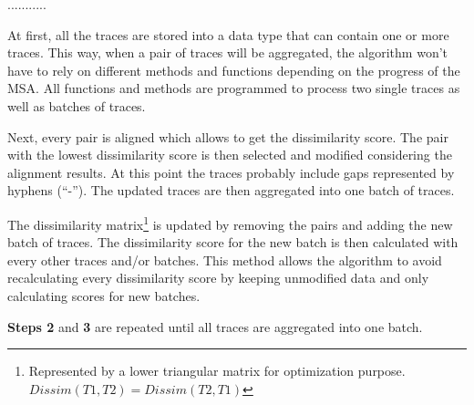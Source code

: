 \documentclass[12pt,a4paper]{article}
\begin{document}
\begin{labeling}{...........}
\item[Step 1] At first, all the traces are stored into a data type that can contain one or more traces.
This way, when a pair of traces will be aggregated, the algorithm won't have to rely on different methods and functions depending on the progress of the MSA.
All functions and methods are programmed to process two single traces as well as batches of traces.

\item[Step 2] Next, every pair is aligned which allows to get the dissimilarity score.
The pair with the lowest dissimilarity score is then selected and modified considering the alignment results.
At this point the traces probably include gaps represented by hyphens (``-'').
The updated traces are then aggregated into one batch of traces.

\item[Step 3] The dissimilarity matrix\footnote{Represented by a lower triangular matrix for optimization purpose. $Dissim(T1, T2) = Dissim(T2, T1)$} is updated by removing the pairs and adding the new batch of traces.
The dissimilarity score for the new batch is then calculated with every other traces and/or batches.
This method allows the algorithm to avoid recalculating every dissimilarity score by keeping unmodified data and only calculating scores for new batches.
\end{labeling}

\noindent\textbf{Steps 2} and \textbf{3} are repeated until all traces are aggregated into one batch.
\end{document}
